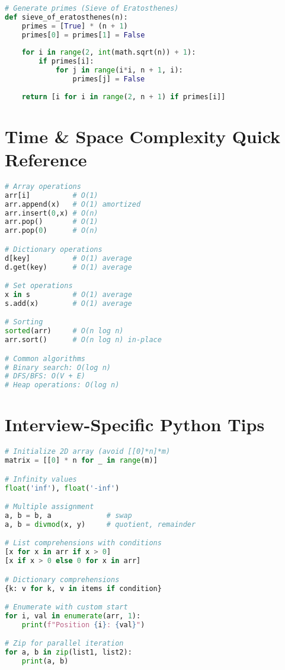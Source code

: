 \documentclass[9pt,a4paper]{article}
\begin{document}
\begin{multicols}{2}
\begin{lstlisting}[language=Python]
# Generate primes (Sieve of Eratosthenes)
def sieve_of_eratosthenes(n):
    primes = [True] * (n + 1)
    primes[0] = primes[1] = False
    
    for i in range(2, int(math.sqrt(n)) + 1):
        if primes[i]:
            for j in range(i*i, n + 1, i):
                primes[j] = False
    
    return [i for i in range(2, n + 1) if primes[i]]
\end{lstlisting}

\section*{Time \& Space Complexity Quick Reference}
\begin{lstlisting}[language=Python]
# Array operations
arr[i]          # O(1)
arr.append(x)   # O(1) amortized
arr.insert(0,x) # O(n)
arr.pop()       # O(1)
arr.pop(0)      # O(n)

# Dictionary operations
d[key]          # O(1) average
d.get(key)      # O(1) average

# Set operations
x in s          # O(1) average
s.add(x)        # O(1) average

# Sorting
sorted(arr)     # O(n log n)
arr.sort()      # O(n log n) in-place

# Common algorithms
# Binary search: O(log n)
# DFS/BFS: O(V + E)
# Heap operations: O(log n)
\end{lstlisting}

\section*{Interview-Specific Python Tips}
\begin{lstlisting}[language=Python]
# Initialize 2D array (avoid [[0]*n]*m)
matrix = [[0] * n for _ in range(m)]

# Infinity values
float('inf'), float('-inf')

# Multiple assignment
a, b = b, a             # swap
a, b = divmod(x, y)     # quotient, remainder

# List comprehensions with conditions
[x for x in arr if x > 0]
[x if x > 0 else 0 for x in arr]

# Dictionary comprehensions
{k: v for k, v in items if condition}

# Enumerate with custom start
for i, val in enumerate(arr, 1):
    print(f"Position {i}: {val}")

# Zip for parallel iteration
for a, b in zip(list1, list2):
    print(a, b)


\end{lstlisting}
\end{multicols}
\end{document}
